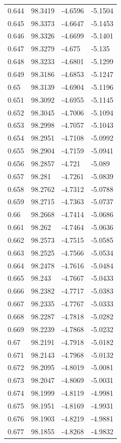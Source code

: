 \begin{tabular}{llll}
0.644 & 98.3419 & -4.6596 & -5.1504 \\
0.645 & 98.3373 & -4.6647 & -5.1453 \\
0.646 & 98.3326 & -4.6699 & -5.1401 \\
0.647 & 98.3279 & -4.675 & -5.135 \\
0.648 & 98.3233 & -4.6801 & -5.1299 \\
0.649 & 98.3186 & -4.6853 & -5.1247 \\
0.65 & 98.3139 & -4.6904 & -5.1196 \\
0.651 & 98.3092 & -4.6955 & -5.1145 \\
0.652 & 98.3045 & -4.7006 & -5.1094 \\
0.653 & 98.2998 & -4.7057 & -5.1043 \\
0.654 & 98.2951 & -4.7108 & -5.0992 \\
0.655 & 98.2904 & -4.7159 & -5.0941 \\
0.656 & 98.2857 & -4.721 & -5.089 \\
0.657 & 98.281 & -4.7261 & -5.0839 \\
0.658 & 98.2762 & -4.7312 & -5.0788 \\
0.659 & 98.2715 & -4.7363 & -5.0737 \\
0.66 & 98.2668 & -4.7414 & -5.0686 \\
0.661 & 98.262 & -4.7464 & -5.0636 \\
0.662 & 98.2573 & -4.7515 & -5.0585 \\
0.663 & 98.2525 & -4.7566 & -5.0534 \\
0.664 & 98.2478 & -4.7616 & -5.0484 \\
0.665 & 98.243 & -4.7667 & -5.0433 \\
0.666 & 98.2382 & -4.7717 & -5.0383 \\
0.667 & 98.2335 & -4.7767 & -5.0333 \\
0.668 & 98.2287 & -4.7818 & -5.0282 \\
0.669 & 98.2239 & -4.7868 & -5.0232 \\
0.67 & 98.2191 & -4.7918 & -5.0182 \\
0.671 & 98.2143 & -4.7968 & -5.0132 \\
0.672 & 98.2095 & -4.8019 & -5.0081 \\
0.673 & 98.2047 & -4.8069 & -5.0031 \\
0.674 & 98.1999 & -4.8119 & -4.9981 \\
0.675 & 98.1951 & -4.8169 & -4.9931 \\
0.676 & 98.1903 & -4.8219 & -4.9881 \\
0.677 & 98.1855 & -4.8268 & -4.9832 \\

\end{tabular}
